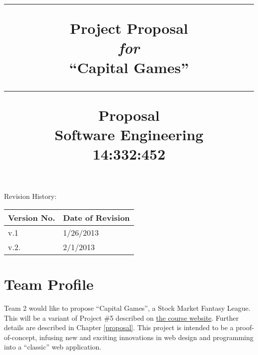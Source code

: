 \documentclass[11pt,letterpaper,oneside]{memoir}
\title{%
{\color{color2} \hrule}\vspace{1cm}
\Huge{\color{color1} Project Proposal\\ %
{\emph{for}}\\
``Capital Games'' \vspace{1cm}
}
{\color{color2} \hrule}\vspace{1cm}
\Large{ \color{color2} Proposal\\
Software Engineering\\
14:332:452}
}
\author{\huge{\color{color1}Team 2:\\}\vskip.1in \Large{\href{mailto:jultimate123@gmail.com}{Jeff Adler} \\\href{mailto:ecuiffo@gmail.com}{Eric Cuiffo}\\\href{mailto:nickpal@eden.rutgers.edu}{Nick Palumbo}\\\href{mailto:rabinowitzjeffc@gmail.com}{Jeff Rabinowitz}\\\href{mailto:vred@scarletmail.rutgers.edu}{Val Red}\\\href{mailto:dario@rethage.net}{Dario Rethage}}}
\begin{document}
\titleGM    %

Revision History:
\begin{longtable}{|p{1.6in}|p{2.6in}|}
\hline
{\large \color{color1}Version No.}&{\large \color{color1}Date of Revision} \\ \hline
v.1&1/26/2013  \\ \hline 
v.2.&2/1/2013  \\ \hline 
\end{longtable}

\pagebreak  %
\tableofcontents %
\chapter{Team Profile}
Team 2 would like to propose ``Capital Games'', a Stock Market Fantasy League.
This will be a variant of Project \#5 described on
\href{http://www.ece.rutgers.edu/~marsic/books/SE/projects/}{the course website}.
Further details are described in Chapter \ref{proposal}. This project is intended
to be a proof-of-concept, infusing new and exciting innovations in web
design and programming into a ``classic'' web application.
\end{document}
